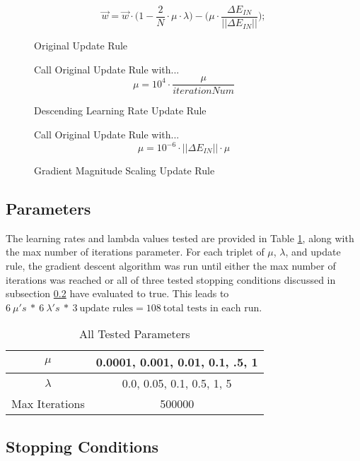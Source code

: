 \documentclass[runningheads]{llncs}
\begin{document}
\begin{figure}[!t]
	
\[\vec{w} = \vec{w} \cdot \Big(1 - \frac{2}{N} \cdot \mu \cdot \lambda \Big) - \Big(\mu \cdot \frac{\Delta E_{IN}}{||\Delta E_{IN}||}\Big);
\]
\caption{Original Update Rule}
\label{fig:originalUR} 
\end{figure}

\begin{figure}[!t]
	\centering Call Original Update Rule with... \[ \mu = 10^{4} \cdot \frac{\mu}{iterationNum}\]
	\caption{Descending Learning Rate Update Rule}
	\label{fig:adaptedUR} 
\end{figure}

\begin{figure}[!t]
	\centering Call Original Update Rule with... \[ \mu =  10^{-6} \cdot ||\Delta E_{IN}|| \cdot \mu\]
	\caption{Gradient Magnitude Scaling Update Rule}
	\label{fig:gradientMagUR} 
\end{figure}

\subsection{Parameters}

The learning rates and lambda values tested are provided in Table \ref{tab:parameters}, along with the max number of iterations parameter. For each triplet of $\mu$, $\lambda$, and update rule, the gradient descent algorithm was run until either the max number of iterations was reached or all of three tested stopping conditions discussed in subsection \ref{subsec:stopping} have evaluated to true. This leads to $6 \ \mu's \ * \ 6 \ \lambda's \ * \ 3 \ \text{update rules} = 108 \ \text{total tests in each run}$. 

\begin{table}[!htbp]
	\centering
	\begin{tabular}	{ | c | c |}
		\hline
		$\mu$& 0.0001, 0.001, 0.01, 0.1, .5, 1 \\ \hline
		$\lambda$ & 0.0, 0.05, 0.1, 0.5, 1, 5 \\ \hline
		Max Iterations & 500000 \\ \hline
	\end{tabular}
	\caption{All Tested Parameters}
	\label{tab:parameters}
\end{table}


\subsection{Stopping Conditions}
\label{subsec:stopping}
\end{document}
